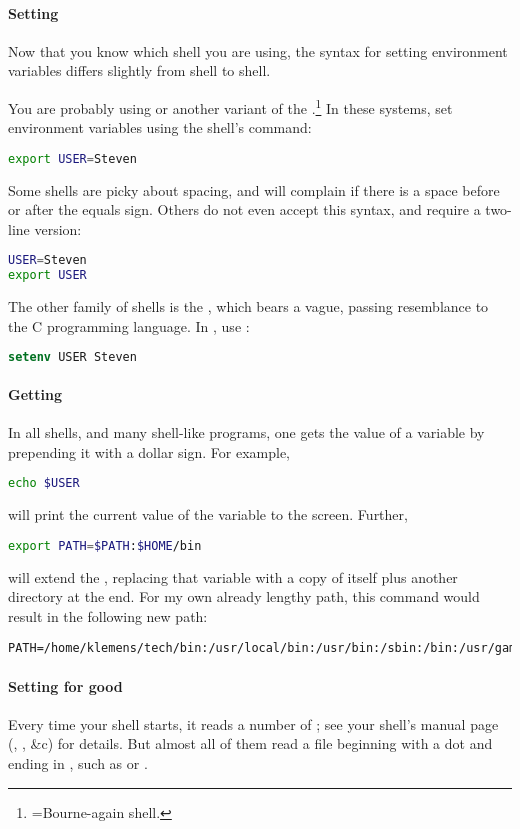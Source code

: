 \paragraph{Setting}
Now that you know which shell you are using, the syntax for setting environment
variables differs slightly from shell to shell.

You are probably using  or another variant of the .\footnote{=Bourne-again shell.} In these systems,
set environment variables using the shell's  command:
\begin{lstlisting}[language=sh]
export USER=Steven
\end{lstlisting}
Some shells are picky about spacing, and will complain if
there is a space before or after the equals sign. Others do not even
accept this syntax, and require a two-line version:
\begin{lstlisting}[language=sh]
USER=Steven
export USER
\end{lstlisting}

The other family of shells is the , which bears a vague, passing
resemblance to the C programming language. In , use :
\begin{lstlisting}[language=csh]
setenv USER Steven
\end{lstlisting}

\paragraph{Getting} In all shells, and many shell-like programs, one
gets the value of a variable by prepending it with a dollar sign. For
example,
\begin{lstlisting}[language=sh]
echo $USER
\end{lstlisting}
will print the current value of the  variable to the screen.
Further, 
\begin{lstlisting}[language=sh]
export PATH=$PATH:$HOME/bin
\end{lstlisting}
will extend the , replacing that variable with a copy of itself
plus another directory at the end. For my own already lengthy path, this command would result in the following new path:
\begin{lstlisting}
PATH=/home/klemens/tech/bin:/usr/local/bin:/usr/bin:/sbin:/bin:/usr/games:/sbin:/home/klemens/bin
\end{lstlisting}

\paragraph{Setting for good}
Every time your shell starts, it reads a number of ;
see your shell's manual page (, , \&c) for
details. But almost all of them read a file beginning with a dot and
ending in , such as  or . 

